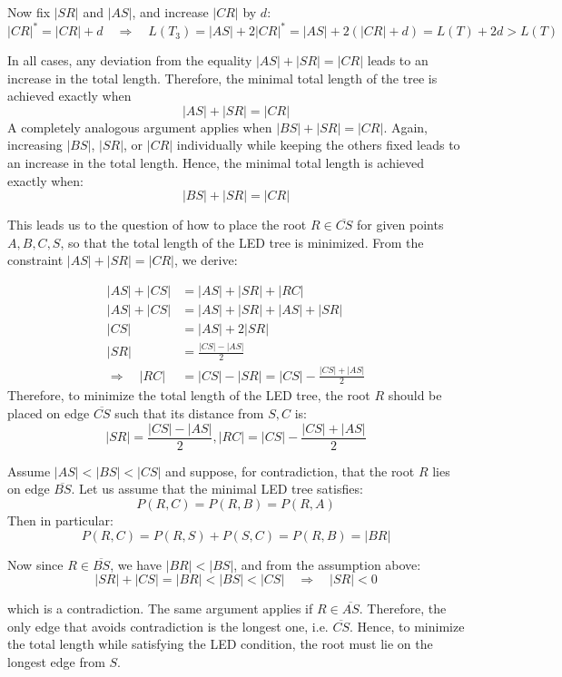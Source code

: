 \documentclass[12pt]{book}
\newcommand{\Price}[2]{P(#1,#2)}
\begin{document}
	Now fix \( |SR| \) and \( |AS| \), and increase \( |CR| \) by \( d \):
	\[
	|CR|^* = |CR| + d \quad \Rightarrow \quad L(T_3) = |AS| + 2|CR|^* = |AS| + 2(|CR| + d) = L(T) + 2d > L(T)
	\]
	
	In all cases, any deviation from the equality \( |AS| + |SR| = |CR| \) leads to an increase in the total length.  
	Therefore, the minimal total length of the tree is achieved exactly when
	\[
	|AS| + |SR| = |CR|
	\]
	A completely analogous argument applies when \( |BS| + |SR| = |CR| \).  
	Again, increasing \( |BS| \), \( |SR| \), or \( |CR| \) individually while keeping the others fixed leads to an increase in the total length.  
	Hence, the minimal total length is achieved exactly when:
	\[
	|BS| + |SR| = |CR|
	\]
	
	
	This leads us to the question of how to place the root \( R \in \overline{CS} \) for given points \( A, B, C, S \), so that the total length of the LED tree is minimized. From the constraint \( |AS|+|SR| = |CR|  \), we derive:
	
	\begin{align*}
		|AS| + |CS| &= |AS| + |SR| + |RC| \\
		|AS|+|CS| &= |AS|+|SR|+|AS|+|SR| \\ 
		|CS| &= |AS|+2|SR| \\
		|SR| &= \frac{|CS| - |AS|}{2} \\
		\Rightarrow \quad |RC| &= |CS| - |SR| = |CS| - \frac{|CS| + |AS|}{2}
	\end{align*}
	Therefore, to minimize the total length of the LED tree, the root \( R \) should be placed on edge \( \overline{CS} \) such that its distance from \( S, C\) is:
	\[
	|SR| = \frac{|CS| - |AS|}{2},  |RC| = |CS| - \frac{|CS| + |AS|}{2}
	\]
	
	Assume \( |AS| < |BS| < |CS| \) and suppose, for contradiction, that the root \( R \) lies on edge \( \overline{BS} \).  
	Let us assume that the minimal LED tree satisfies:
	\[
	\Price{R}{C} = \Price{R}{B} = \Price{R}{A}
	\]
	Then in particular:
	\[
	\Price{R}{C} = \Price{R}{S} + \Price{S}{C} = \Price{R}{B} = |BR|
	\]
	
	Now since \( R \in \overline{BS} \), we have \( |BR| < |BS| \), and from the assumption above:
	\[
	|SR| + |CS| = |BR| < |BS| < |CS|
	\quad \Rightarrow \quad |SR| < 0
	\]
	
	which is a contradiction.  
	The same argument applies if \( R \in \overline{AS} \).  
	Therefore, the only edge that avoids contradiction is the longest one, i.e. \( \overline{CS} \).  
	Hence, to minimize the total length while satisfying the LED condition, the root must lie on the longest edge from \( S \).
	
	
\end{document}
